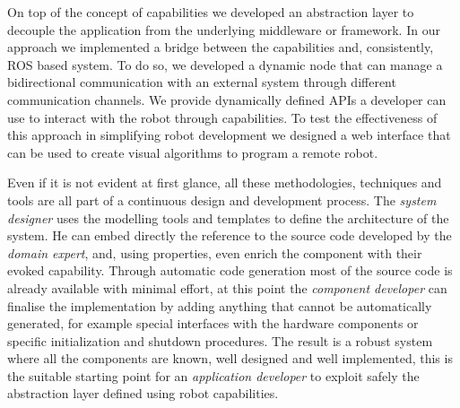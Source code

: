 On top of the concept of capabilities we developed an abstraction layer to decouple the application from the underlying middleware or framework. In our approach we implemented a bridge between the capabilities and, consistently, ROS based system. To do so, we developed a dynamic node that can manage a bidirectional communication with an external system through different communication channels. We provide dynamically defined APIs a developer can use to interact with the robot through capabilities. To test the effectiveness of this approach in simplifying robot development we designed a web interface that can be used to create visual algorithms to program a remote robot.

Even if it is not evident at first glance, all these methodologies, techniques and tools are all part of a continuous design and development process. The \textit{system designer} uses the modelling tools and templates to define the architecture of the system. He can embed directly the reference to the source code developed by the \textit{domain expert}, and, using properties, even enrich the component with their evoked capability. Through automatic code generation most of the source code is already available with minimal effort, at this point the \textit{component developer} can finalise the implementation by adding anything that cannot be automatically generated, for example special interfaces with the hardware components or specific initialization and shutdown procedures. The result is a robust system where all the components are known, well designed and well implemented, this is the suitable starting point for an \textit{application developer} to exploit safely the abstraction layer defined using robot capabilities.

